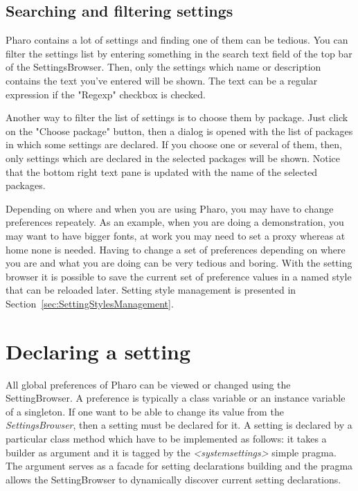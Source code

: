 \documentclass[a4paper,10pt,twoside]{book}
\begin{document}
\subsection{Searching and filtering settings}
Pharo contains a lot of settings and finding one of them can be tedious. 
You can filter the settings list by entering something in the search text field of the top bar of the SettingsBrowser. Then, only the settings which name or description contains the text you've entered will be shown. The text can be a regular expression if the "Regexp" checkbox is checked.

Another way to filter the list of settings is to choose them by package. Just click on the "Choose package" button, then a dialog is opened with the list of packages in which some settings are declared. If you choose one or several of them, then, only settings which are declared in the selected packages will be shown. Notice that the bottom right text pane is updated with the name of the selected packages.

Depending on where and when you are using Pharo, you may have to change preferences repeately. As an example, when you are doing a demonstration, you may want to have bigger fonts, at work you may need to set a proxy whereas at home none is needed. Having to change a set of preferences depending on where you are and what you are doing can be very tedious and boring. With the setting browser it is possible to save the current set of preference values in a named style that can be reloaded later. Setting style management is presented in Section~\ref{sec:SettingStylesManagement}.

\section{Declaring a setting}
\label{sec:DeclaringASetting}

All global preferences of Pharo can be viewed or changed using the SettingBrowser. A preference is typically a class variable or an instance variable of a singleton. If one want to be able to change its value from the \textit{SettingsBrowser}, then a setting must be declared for it.
A setting is declared by a particular class method which have to be implemented as follows: it takes a builder as argument and it is tagged by the \textit{<systemsettings>} simple pragma. 
The argument  serves as a facade for setting declarations building and the pragma allows the SettingBrowser to dynamically discover current setting declarations.
\end{document}

